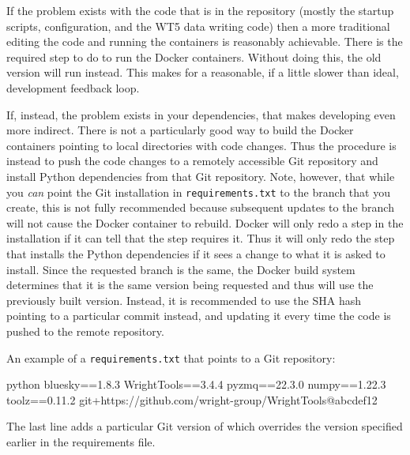If the problem exists with the code that is in the \biab repository (mostly the startup scripts, configuration, and the WT5 data writing code) then a more traditional editing the code and running the containers is reasonably achievable.
There is the required step to do  to run the Docker containers.
Without doing this, the old version will run instead.
This makes for a reasonable, if a little slower than ideal, development feedback loop.

If, instead, the problem exists in your dependencies, that makes developing even more indirect.
There is not a particularly good way to build the Docker containers pointing to local directories with code changes.
Thus the procedure is instead to push the code changes to a remotely accessible Git repository and install Python dependencies from that Git repository.
Note, however, that while you \textit{can} point the Git installation in \texttt{requirements.txt} to the branch that you create, this is not fully recommended because subsequent updates to the branch will not cause the Docker container to rebuild.
Docker will only redo a step in the installation if it can tell that the step requires it.
Thus it will only redo the step that installs the Python dependencies if it sees a change to what it is asked to install.
Since the requested branch is the same, the Docker build system determines that it is the same version being requested and thus will use the previously built version.
Instead, it is recommended to use the SHA hash pointing to a particular commit instead, and updating it every time the code is pushed to the remote repository.

An example of a \texttt{requirements.txt} that points to a Git repository:

\begin{codefragment}{python}
bluesky==1.8.3
WrightTools==3.4.4
pyzmq==22.3.0
numpy==1.22.3
toolz==0.11.2
git+https://github.com/wright-group/WrightTools@abcdef12
\end{codefragment}

The last line adds a particular Git version of \wrighttools which overrides the version specified earlier in the requirements file.

